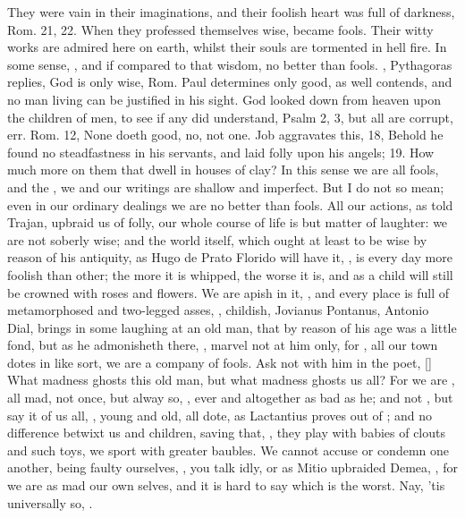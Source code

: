 {They were vain in their imaginations, and their foolish heart was full
of darkness, Rom.  21, 22. When they professed themselves wise,
became fools. Their witty works are admired here on earth, whilst their
souls are tormented in hell fire. In some sense, ,
and if compared to that wisdom, no better
than fools. , Pythagoras replies, God
is only wise, Rom.  Paul determines only good, as \Austin{} well
contends, and no man living can be justified in his sight. God looked
down from heaven upon the children of men, to see if any did
understand, Psalm  2, 3, but all are corrupt, err. Rom.  12,
None doeth good, no, not one. Job aggravates this,  18, Behold he
found no steadfastness in his servants, and laid folly upon his angels;
19. How much more on them that dwell in houses of clay? In this sense
we are all fools, and the , we and
our writings are shallow and imperfect. But I do not so mean; even in
our ordinary dealings we are no better than fools. All our actions, as
\Pliny{} told Trajan, upbraid us of folly, our whole course of life
is but matter of laughter: we are not soberly wise; and the world
itself, which ought at least to be wise by reason of his antiquity, as
Hugo de Prato Florido will have it, , is every day
more foolish than other; the more it is whipped, the worse it is, and
as a child will still be crowned with roses and flowers. We are apish
in it, , and every place is full  of
metamorphosed and two-legged asses, , childish,
 Jovianus
Pontanus, Antonio Dial, brings in some laughing at an old man, that by
reason of his age was a little fond, but as he admonisheth there, , marvel not at him only, for , all our town dotes in like sort, we are a
company of fools. Ask not with him in the poet, [\baselineskip] What madness ghosts this old
man, but what madness ghosts us all? For we are , all mad,
 not once, but alway so, , ever and altogether as bad as he; and not , but say it of us all, , young and old, all
dote, as Lactantius proves out of \Seneca; and no difference betwixt us
and children, saving that, , they
play with babies of clouts and such toys, we sport with greater
baubles. We cannot accuse or condemn one another, being faulty
ourselves, , you talk idly, or as Mitio
upbraided Demea, , for we are as mad our own selves,
and it is hard to say which is the worst. Nay, 'tis universally so,
.

}
